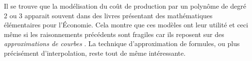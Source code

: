 Il se trouve que la modélisation du coût de production par un polynôme de degré 2 ou 3 apparait souvent dans des livres présentant des mathématiques élémentaires pour l'Économie. Cela montre que ces modèles ont leur utilité et ceci même si les raisonnements précédents sont fragiles car ils reposent sur des \emph{\og approximations de courbes \fg} . La technique d'approximation de formules, ou plus précisément d'interpolation, reste tout de même intéressante.